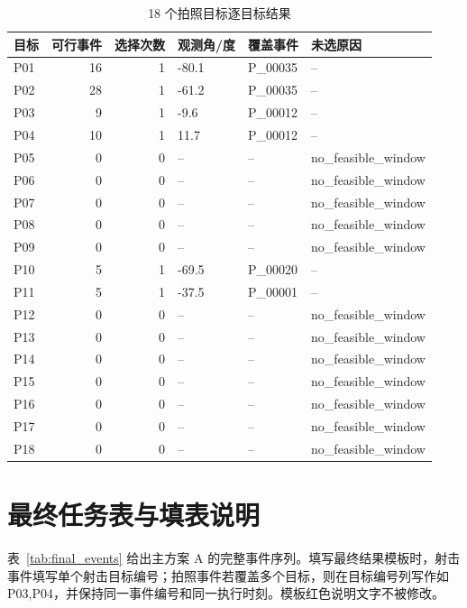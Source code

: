 \documentclass{cumcmthesis}
\begin{document}
\begin{table}[H]
  \centering
  \caption{18 个拍照目标逐目标结果}
  \label{tab:photo_targets}
  \small
  \setlength{\tabcolsep}{4pt}
  \begin{tabular}{lrrlll}
    \toprule
    目标 & 可行事件 & 选择次数 & 观测角/度 & 覆盖事件 & 未选原因\\
    \midrule
    P01 & 16 & 1 & -80.1 & P\_00035 & --\\
    P02 & 28 & 1 & -61.2 & P\_00035 & --\\
    P03 & 9 & 1 & -9.6 & P\_00012 & --\\
    P04 & 10 & 1 & 11.7 & P\_00012 & --\\
    P05 & 0 & 0 & -- & -- & no\_feasible\_window\\
    P06 & 0 & 0 & -- & -- & no\_feasible\_window\\
    P07 & 0 & 0 & -- & -- & no\_feasible\_window\\
    P08 & 0 & 0 & -- & -- & no\_feasible\_window\\
    P09 & 0 & 0 & -- & -- & no\_feasible\_window\\
    P10 & 5 & 1 & -69.5 & P\_00020 & --\\
    P11 & 5 & 1 & -37.5 & P\_00001 & --\\
    P12 & 0 & 0 & -- & -- & no\_feasible\_window\\
    P13 & 0 & 0 & -- & -- & no\_feasible\_window\\
    P14 & 0 & 0 & -- & -- & no\_feasible\_window\\
    P15 & 0 & 0 & -- & -- & no\_feasible\_window\\
    P16 & 0 & 0 & -- & -- & no\_feasible\_window\\
    P17 & 0 & 0 & -- & -- & no\_feasible\_window\\
    P18 & 0 & 0 & -- & -- & no\_feasible\_window\\
    \bottomrule
  \end{tabular}
\end{table}

\section{最终任务表与填表说明}
表~\ref{tab:final_events} 给出主方案 A 的完整事件序列。填写最终结果模板时，射击事件填写单个射击目标编号；拍照事件若覆盖多个目标，则在目标编号列写作如 P03,P04，并保持同一事件编号和同一执行时刻。模板红色说明文字不被修改。
\end{document}
